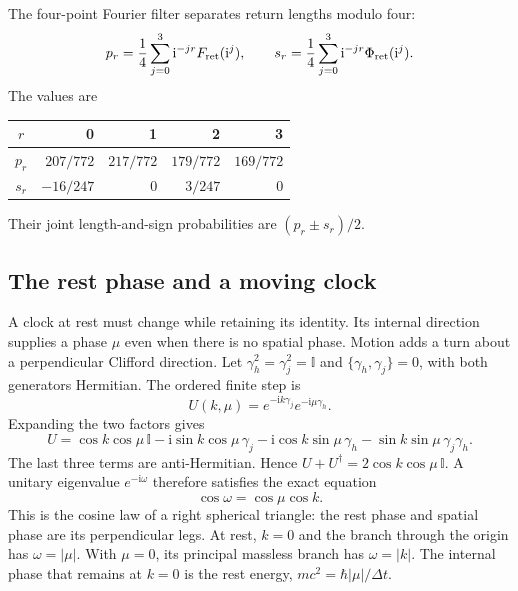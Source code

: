 \documentclass[aps,prx,onecolumn,10pt,notitlepage,nofootinbib,longbibliography]{revtex4-2}
\numberwithin{equation}{section}
\numberwithin{table}{section}
\newcommand{\Id}{\mathbb I}
\newcommand{\ii}{\mathrm i}
\newcommand{\Fret}{F_{\mathrm{ret}}}
\newcommand{\Phis}{\Phi_{\rm ret}}
\begin{document}
The four-point Fourier filter separates return lengths modulo four:
\begin{equation}
 p_r=\frac14\sum_{j=0}^3\ii^{-jr}\Fret(\ii^j),\qquad
 s_r=\frac14\sum_{j=0}^3\ii^{-jr}\Phis(\ii^j).
 \label{eq:quarterfilter}
\end{equation}
The values are
\begin{center}
\begin{tabular}{c|rrrr}
\toprule $r$&0&1&2&3\\\midrule
$p_r$&$207/772$&$217/772$&$179/772$&$169/772$\\
$s_r$&$-16/247$&0&$3/247$&0\\\bottomrule
\end{tabular}
\end{center}
Their joint length-and-sign probabilities are $(p_r\pm s_r)/2$.

\subsection{The rest phase and a moving clock}
\label{sec:finiteclock}

A clock at rest must change while retaining its identity. Its internal direction supplies a phase $\mu$ even when there is no spatial phase. Motion adds a turn about a perpendicular Clifford direction. Let $\gamma_h^2=\gamma_j^2=\Id$ and $\{\gamma_h,\gamma_j\}=0$, with both generators Hermitian. The ordered finite step is
\begin{equation}
 U(k,\mu)=e^{-\ii k\gamma_j}e^{-\ii\mu\gamma_h}.
 \label{eq:finiteclockunitary}
\end{equation}
Expanding the two factors gives
\[
 U=\cos k\cos\mu\,\Id
 -\ii\sin k\cos\mu\,\gamma_j
 -\ii\cos k\sin\mu\,\gamma_h
 -\sin k\sin\mu\,\gamma_j\gamma_h.
\]
The last three terms are anti-Hermitian. Hence $U+U^\dagger=2\cos k\cos\mu\,\Id$. A unitary eigenvalue $e^{-\ii\omega}$ therefore satisfies the exact equation
\begin{equation}
 \boxed{\cos\omega=\cos\mu\cos k.}
 \label{eq:finiteclockdispersion}
\end{equation}
This is the cosine law of a right spherical triangle: the rest phase and spatial phase are its perpendicular legs. At rest, $k=0$ and the branch through the origin has $\omega=|\mu|$. With $\mu=0$, its principal massless branch has $\omega=|k|$. The internal phase that remains at $k=0$ is the rest energy, $mc^2=\hbar|\mu|/\Delta t$.
\end{document}
